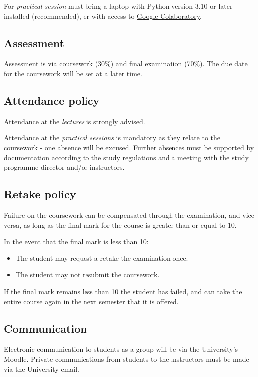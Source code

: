 \documentclass{article}
\begin{document}
For \emph{practical session} must bring a laptop with Python version 3.10 or
later installed (recommended), or with access to
\href{https://colab.research.google.com}{Google Colaboratory}.

\subsection{Assessment}

Assessment is via coursework (30\%) and final examination (70\%). The due date
for the coursework will be set at a later time.

\subsection{Attendance policy}

Attendance at the \emph{lectures} is strongly advised.

Attendance at the \emph{practical sessions} is mandatory as they relate to the
coursework - one absence will be excused. Further absences must be supported by
documentation according to the study regulations and a meeting with the study
programme director and/or instructors.

\subsection{Retake policy}

Failure on the coursework can be compensated through the examination, and vice
versa, as long as the final mark for the course is greater than or equal to 10.

In the event that the final mark is less than 10:

\begin{itemize}
\item The student may request a retake the examination once.
\item The student may not resubmit the coursework.
\end{itemize}

If the final mark remains less than 10 the student has failed, and can take the
entire course again in the next semester that it is offered.

\subsection{Communication}

Electronic communication to students as a group will be via the University's
Moodle. Private communications from students to the instructors must be made
via the University email.

\printbibliography
\end{document}
